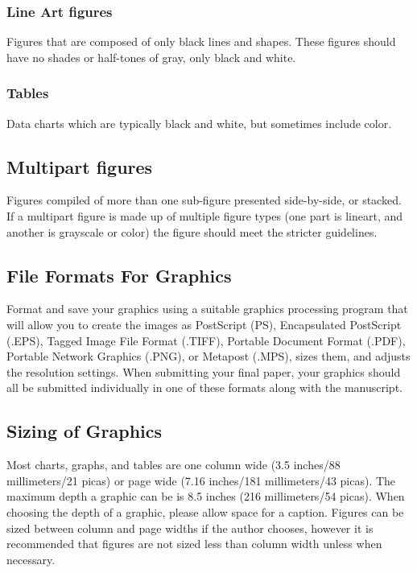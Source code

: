\documentclass[journal]{IEEEtran}
\begin{document}
\subsubsection{Line Art figures}
{Figures that are composed of only black lines and shapes. These figures 
should have no shades or half-tones of gray, only black and white.}

\subsubsection{Tables}
{Data charts which are typically black and white, but sometimes include 
color.}



\subsection{Multipart figures}
Figures compiled of more than one sub-figure presented side-by-side, or 
stacked. If a multipart figure is made up of multiple figure
types (one part is lineart, and another is grayscale or color) the figure 
should meet the stricter guidelines.

\subsection{File Formats For Graphics}\label{formats}
Format and save your graphics using a suitable graphics processing program 
that will allow you to create the images as PostScript (PS), Encapsulated 
PostScript (.EPS), Tagged Image File Format (.TIFF), Portable Document 
Format (.PDF), Portable Network Graphics (.PNG), or Metapost (.MPS), sizes them, and adjusts 
the resolution settings. When 
submitting your final paper, your graphics should all be submitted 
individually in one of these formats along with the manuscript.

\subsection{Sizing of Graphics}
Most charts, graphs, and tables are one column wide (3.5 inches/88 
millimeters/21 picas) or page wide (7.16 inches/181 millimeters/43 
picas). The maximum depth a graphic can be is 8.5 inches (216 millimeters/54
picas). When choosing the depth of a graphic, please allow space for a 
caption. Figures can be sized between column and page widths if the author 
chooses, however it is recommended that figures are not sized less than 
column width unless when necessary. 
\end{document}
